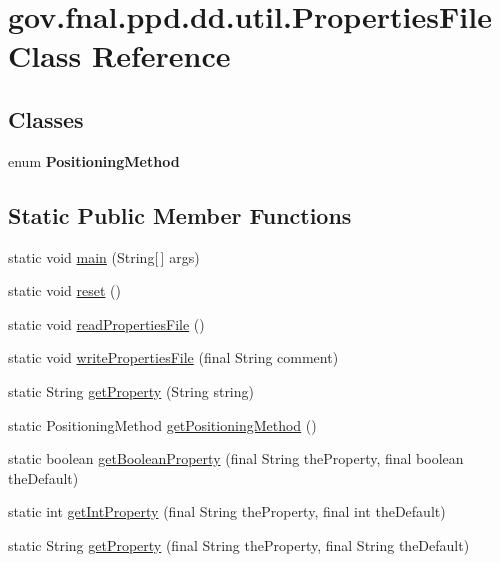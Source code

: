 \hypertarget{classgov_1_1fnal_1_1ppd_1_1dd_1_1util_1_1PropertiesFile}{\section{gov.\-fnal.\-ppd.\-dd.\-util.\-Properties\-File Class Reference}
\label{classgov_1_1fnal_1_1ppd_1_1dd_1_1util_1_1PropertiesFile}
}
\subsection*{Classes}
\begin{DoxyCompactItemize}
\item 
enum {\bfseries Positioning\-Method}
\end{DoxyCompactItemize}
\subsection*{Static Public Member Functions}
\begin{DoxyCompactItemize}
\item 
static void \hyperlink{classgov_1_1fnal_1_1ppd_1_1dd_1_1util_1_1PropertiesFile_a7be41c95da3f46ba50e479a5d3050a0b}{main} (String\mbox{[}$\,$\mbox{]} args)
\item 
static void \hyperlink{classgov_1_1fnal_1_1ppd_1_1dd_1_1util_1_1PropertiesFile_af1174d53278bd5bccced059a4f1ff94d}{reset} ()
\item 
static void \hyperlink{classgov_1_1fnal_1_1ppd_1_1dd_1_1util_1_1PropertiesFile_a7864ef2216034121b08c7066e4cebfdd}{read\-Properties\-File} ()
\item 
static void \hyperlink{classgov_1_1fnal_1_1ppd_1_1dd_1_1util_1_1PropertiesFile_a93bbfd7a45716bb5e7087e70dd52a858}{write\-Properties\-File} (final String comment)
\item 
static String \hyperlink{classgov_1_1fnal_1_1ppd_1_1dd_1_1util_1_1PropertiesFile_a72138f25e2d2cc91abfe8ce18b5d2eb3}{get\-Property} (String string)
\item 
static Positioning\-Method \hyperlink{classgov_1_1fnal_1_1ppd_1_1dd_1_1util_1_1PropertiesFile_aa4951a242be44a8813a235c590445617}{get\-Positioning\-Method} ()
\item 
static boolean \hyperlink{classgov_1_1fnal_1_1ppd_1_1dd_1_1util_1_1PropertiesFile_a97468db291bec19c74a699b230aa8ba8}{get\-Boolean\-Property} (final String the\-Property, final boolean the\-Default)
\item 
static int \hyperlink{classgov_1_1fnal_1_1ppd_1_1dd_1_1util_1_1PropertiesFile_a7c94841a2b3e49c8c26bc8a45ce7e1f6}{get\-Int\-Property} (final String the\-Property, final int the\-Default)
\item 
static String \hyperlink{classgov_1_1fnal_1_1ppd_1_1dd_1_1util_1_1PropertiesFile_a8a8a0e08dc2ab3d3cb52ea2d3ed2222d}{get\-Property} (final String the\-Property, final String the\-Default)
\end{DoxyCompactItemize}


